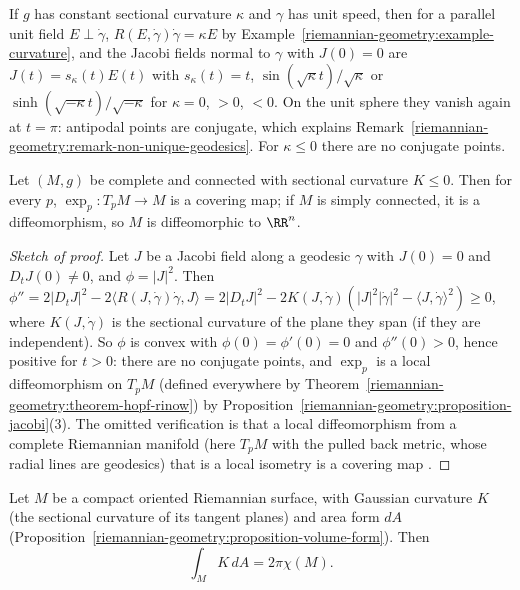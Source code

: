 \begin{example}\label{riemannian-geometry:example-jacobi-constant}
If $g$ has constant sectional curvature $\kappa$ and $\gamma$ has unit speed, then for a parallel unit field $E \perp \dot\gamma$, $R(E, \dot\gamma)\dot\gamma = \kappa E$ by Example~\ref{riemannian-geometry:example-curvature}, and the Jacobi fields
normal to $\gamma$ with $J(0) = 0$ are $J(t) = s_\kappa(t)E(t)$ with $s_\kappa(t) = t$, $\sin(\sqrt\kappa t)/\sqrt\kappa$ or $\sinh(\sqrt{-\kappa}t)/\sqrt{-\kappa}$ for $\kappa = 0$, $> 0$, $< 0$. On the unit sphere they vanish again at $t = \pi$: antipodal
points are conjugate, which explains Remark~\ref{riemannian-geometry:remark-non-unique-geodesics}. For $\kappa \leq 0$ there are no conjugate points.
\end{example}

\begin{theorem}\label{riemannian-geometry:theorem-cartan-hadamard}
Let $(M, g)$ be complete and connected with sectional curvature $K \leq 0$. Then for every $p$, $\exp_p \colon T_pM \to M$ is a covering map; if $M$ is simply connected, it is a diffeomorphism, so $M$ is diffeomorphic to $\RR^n$.
\end{theorem}

\begin{proof}[Sketch of proof]
Let $J$ be a Jacobi field along a geodesic $\gamma$ with $J(0) = 0$ and $D_tJ(0) \neq 0$, and $\phi = |J|^2$. Then
$\phi'' = 2|D_tJ|^2 - 2\langle R(J, \dot\gamma)\dot\gamma, J\rangle = 2|D_tJ|^2 - 2K(J, \dot\gamma)(|J|^2|\dot\gamma|^2 - \langle J, \dot\gamma\rangle^2) \geq 0$, where $K(J, \dot\gamma)$ is the sectional curvature of the plane they span (if they are
independent). So $\phi$ is convex with $\phi(0) = \phi'(0) = 0$ and $\phi''(0) > 0$, hence positive for $t > 0$: there are no conjugate points, and $\exp_p$ is a local diffeomorphism on $T_pM$ (defined everywhere by
Theorem~\ref{riemannian-geometry:theorem-hopf-rinow}) by Proposition~\ref{riemannian-geometry:proposition-jacobi}(3). The omitted verification is that a local diffeomorphism from a complete Riemannian manifold (here $T_pM$ with the
pulled back metric, whose radial lines are geodesics) that is a local isometry is a covering map \cite[Chapter 7]{do-carmo-riemannian}.
\end{proof}

\begin{theorem}\label{riemannian-geometry:theorem-gauss-bonnet}
Let $M$ be a compact oriented Riemannian surface, with Gaussian curvature $K$ (the sectional curvature of its tangent planes) and area form $dA$
(Proposition~\ref{riemannian-geometry:proposition-volume-form}). Then
\[
\int_MK\,dA = 2\pi\chi(M) .
\]
\end{theorem}

